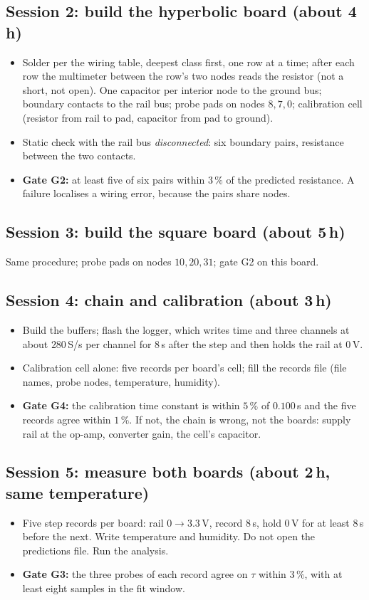 \documentclass[11pt,a4paper]{article}
\newcommand{\chk}{$\square$\ }
\begin{document}
\subsection*{Session 2: build the hyperbolic board (about 4\,h)}
\begin{itemize}
\item[\chk] Solder per the wiring table, deepest class first, one row at a time; after each row the multimeter between the row's two nodes reads the resistor (not a short, not open). One capacitor per interior node to the ground bus; boundary contacts to the rail bus; probe pads on nodes $8,7,0$; calibration cell (resistor from rail to pad, capacitor from pad to ground).
\item[\chk] Static check with the rail bus \emph{disconnected}: six boundary pairs, resistance between the two contacts.
\item[] \textbf{Gate G2:} at least five of six pairs within $3\,\%$ of the predicted resistance. A failure localises a wiring error, because the pairs share nodes.
\end{itemize}

\subsection*{Session 3: build the square board (about 5\,h)}
Same procedure; probe pads on nodes $10,20,31$; gate G2 on this board.

\subsection*{Session 4: chain and calibration (about 3\,h)}
\begin{itemize}
\item[\chk] Build the buffers; flash the logger, which writes time and three channels at about $280$\,S/s per channel for $8$\,s after the step and then holds the rail at $0$\,V.
\item[\chk] Calibration cell alone: five records per board's cell; fill the records file (file names, probe nodes, temperature, humidity).
\item[] \textbf{Gate G4:} the calibration time constant is within $5\,\%$ of $0.100$\,s and the five records agree within $1\,\%$. If not, the chain is wrong, not the boards: supply rail at the op-amp, converter gain, the cell's capacitor.
\end{itemize}

\subsection*{Session 5: measure both boards (about 2\,h, same temperature)}
\begin{itemize}
\item[\chk] Five step records per board: rail $0\to3.3$\,V, record $8$\,s, hold $0$\,V for at least $8$\,s before the next. Write temperature and humidity. Do not open the predictions file. Run the analysis.
\item[] \textbf{Gate G3:} the three probes of each record agree on $\tau$ within $3\,\%$, with at least eight samples in the fit window.
\end{itemize}
\end{document}
